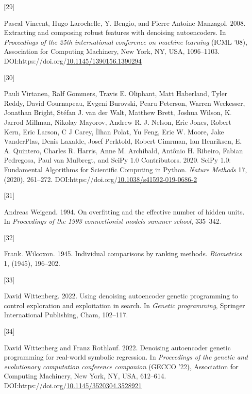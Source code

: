 \documentclass[
  11pt,
]{article}
\newlength{\cslhangindent}
\newlength{\csllabelwidth}
\newlength{\cslentryspacingunit} %
\newenvironment{CSLReferences}[2] %
 {%
  \setlength{\parindent}{0pt}
  \ifodd #1
  \let\oldpar\par
  \def\par{\hangindent=\cslhangindent\oldpar}
  \fi
  \setlength{\parskip}{#2\cslentryspacingunit}
 }%
 {}
\newcommand{\CSLLeftMargin}[1]{\parbox[t]{\csllabelwidth}{#1}}
\newcommand{\CSLRightInline}[1]{\parbox[t]{\linewidth - \csllabelwidth}{#1}\break}
\begin{document}
\begin{CSLReferences}{0}{0}
\leavevmode{}%
\CSLLeftMargin{{[}29{]} }%
\CSLRightInline{Pascal Vincent, Hugo Larochelle, Y. Bengio, and Pierre-Antoine Manzagol. 2008. Extracting and composing robust features with denoising autoencoders. In \emph{Proceedings of the 25th international conference on machine learning} (ICML '08), Association for Computing Machinery, New York, NY, USA, 1096--1103. DOI:https://doi.org/\href{https://doi.org/10.1145/1390156.1390294}{10.1145/1390156.1390294}}

\leavevmode{}%
\CSLLeftMargin{{[}30{]} }%
\CSLRightInline{Pauli Virtanen, Ralf Gommers, Travis E. Oliphant, Matt Haberland, Tyler Reddy, David Cournapeau, Evgeni Burovski, Pearu Peterson, Warren Weckesser, Jonathan Bright, Stéfan J. van der Walt, Matthew Brett, Joshua Wilson, K. Jarrod Millman, Nikolay Mayorov, Andrew R. J. Nelson, Eric Jones, Robert Kern, Eric Larson, C J Carey, İlhan Polat, Yu Feng, Eric W. Moore, Jake VanderPlas, Denis Laxalde, Josef Perktold, Robert Cimrman, Ian Henriksen, E. A. Quintero, Charles R. Harris, Anne M. Archibald, Antônio H. Ribeiro, Fabian Pedregosa, Paul van Mulbregt, and SciPy 1.0 Contributors. 2020. {{SciPy} 1.0: Fundamental Algorithms for Scientific Computing in Python}. \emph{Nature Methods} 17, (2020), 261--272. DOI:https://doi.org/\href{https://doi.org/10.1038/s41592-019-0686-2}{10.1038/s41592-019-0686-2}}

\leavevmode{}%
\CSLLeftMargin{{[}31{]} }%
\CSLRightInline{Andreas Weigend. 1994. On overfitting and the effective number of hidden units. In \emph{Proceedings of the 1993 connectionist models summer school}, 335--342.}

\leavevmode{}%
\CSLLeftMargin{{[}32{]} }%
\CSLRightInline{Frank. Wilcoxon. 1945. Individual comparisons by ranking methods. \emph{Biometrics} 1, (1945), 196--202.}

\leavevmode{}%
\CSLLeftMargin{{[}33{]} }%
\CSLRightInline{David Wittenberg. 2022. Using denoising autoencoder genetic programming to control exploration and exploitation in search. In \emph{Genetic programming}, Springer International Publishing, Cham, 102--117.}

\leavevmode{}%
\CSLLeftMargin{{[}34{]} }%
\CSLRightInline{David Wittenberg and Franz Rothlauf. 2022. Denoising autoencoder genetic programming for real-world symbolic regression. In \emph{Proceedings of the genetic and evolutionary computation conference companion} (GECCO '22), Association for Computing Machinery, New York, NY, USA, 612--614. DOI:https://doi.org/\href{https://doi.org/10.1145/3520304.3528921}{10.1145/3520304.3528921}}


\end{CSLReferences}
\end{document}
